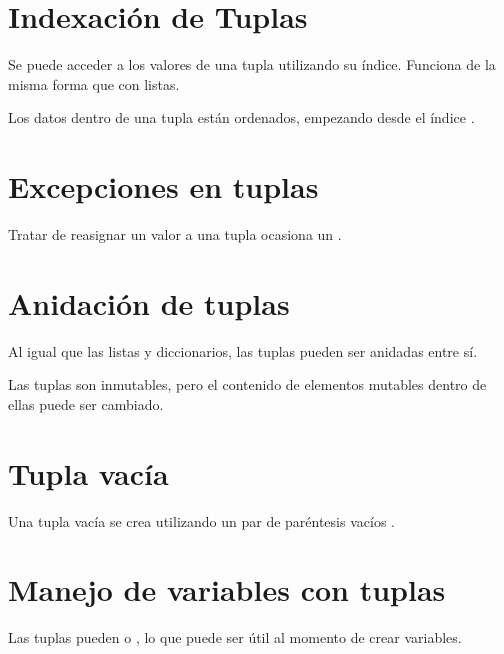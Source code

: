 \section{Indexación de Tuplas}

Se puede acceder a los valores de una tupla utilizando su índice.
Funciona de la misma forma que con listas.


Los datos dentro de una tupla están ordenados, empezando desde el índice .

\section{Excepciones en tuplas}

Tratar de reasignar un valor a una tupla ocasiona un .


\section{Anidación de tuplas}

Al igual que las listas y diccionarios, las tuplas pueden ser anidadas entre sí.

Las tuplas son inmutables, pero el contenido de elementos mutables dentro de ellas puede ser cambiado.


\section{Tupla vacía}

Una tupla vacía se crea utilizando un par de paréntesis vacíos \ttt{()}.


\section{Manejo de variables con tuplas}

Las tuplas pueden  o , lo que puede ser útil al momento de crear variables.

